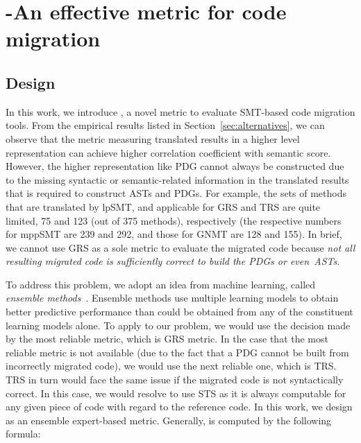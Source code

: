 \section{{\model}-An effective metric for code migration}
\label{sec:proposal}


\subsection{Design}

%

In this work, we introduce {\model}, a novel metric to evaluate
SMT-based code migration tools.  From the empirical results
listed in Section~\ref{sec:alternatives}, we can observe that the
metric measuring translated results in a higher level representation
can achieve higher correlation coefficient with semantic score.
%
However, the higher representation like PDG cannot always be
constructed due to the missing syntactic or semantic-related
information in the translated results that is required to construct
ASTs and PDGs. For example, the sets of methods that are translated by
lpSMT, and applicable for GRS and TRS are quite limited, 75 and 123
(out of 375 methods), respectively (the respective numbers for mppSMT
are 239 and 292, and those for GNMT are 128 and 155).
In brief, we cannot use GRS as a sole metric to evaluate the migrated code
because {\em not all resulting migrated code is sufficiently correct
  to build the PDGs or even~ASTs}.

To address this problem, we adopt an idea from machine learning,
called {\em ensemble methods}~\cite{ensemble}. Ensemble methods
use multiple learning models to obtain better
predictive performance than could be obtained from any of the
constituent learning models alone.
To apply to our problem, we would use the decision made by the most
reliable metric, which is GRS metric. In the case that the most
reliable metric is not available (due to the fact that a PDG cannot
be built from incorrectly migrated code), we would use the next
reliable one, which is TRS. TRS in turn would face the same issue if
the migrated code is not syntactically correct. In this case, we would
resolve to use STS as it is always computable for any given piece of
code with regard to the reference code. In this work, we design 
{\model} as an ensemble expert-based metric. Generally, {\model} is 
computed by the following formula:

